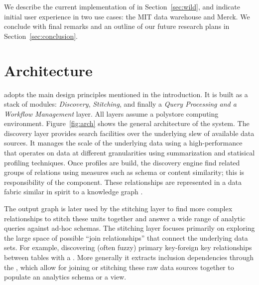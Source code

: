 We describe the  current implementation of \dcv  in Section~\ref{sec:wild}, and indicate initial user experience in two use cases: the  MIT data warehouse and Merck. We conclude with final remarks and an  outline of  our future research plans in Section~\ref{sec:conclusion}.


\section{Architecture}
\label{sec:arch}

\dcv adopts the main design principles mentioned in the introduction. %
It is built as a stack of modules: {\em Discovery}, {\em Stitching}, and finally 
a {\em Query Processing and a Workflow Management} layer. All layers assume a polystore computing environment. Figure~\ref{fig:arch} shows the
general architecture of the \dcv system. 
The discovery layer provides search facilities over the underlying slew of available data sources.
It manages the scale of the underlying data using a high-performance  that
operates on data at different granularities using summarization and statisical profiling techniques.
 Once profiles are build, the discovery engine find related groups of relations using
 measures  such as schema or content similarity;  this is responsibility of the
  component. These relationships are
represented in a data fabric similar in spirit to a knowledge graph
\cite{DBLP:conf/semweb/AuerBKLCI07,DBLP:conf/sigmod/BollackerEPST08,DBLP:conf/www/SuchanekKW07}.

The output graph is later used by the stitching layer to find more complex
relationships to stitch these units together and answer a wide range of
analytic queries against ad-hoc schemas. The stitching layer focuses primarily on
exploring the large space of possible ``join relationships'' that connect the
underlying data sets. For example, discovering (often fuzzy) primary key-foreign
key relationships between tables with a . More
generally it extracts inclusion dependencies through the ,
which allow for joining or stitching these raw data sources together to populate
an analytics schema or a view. 


